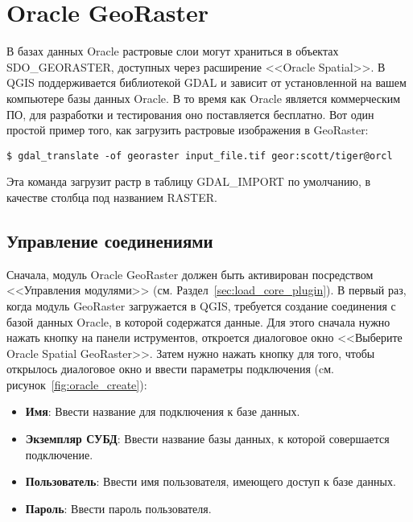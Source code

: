 
\section{Oracle GeoRaster}


В базах данных Oracle растровые слои могут храниться в объектах
SDO\_GEORASTER, доступных через расширение <<Oracle Spatial>>. В QGIS
 поддерживается
библиотекой GDAL и зависит от установленной на вашем компьютере базы
данных Oracle. В то время как Oracle является коммерческим ПО, для
разработки и тестирования оно поставляется бесплатно. Вот один простой
пример того, как загрузить растровые изображения в GeoRaster:

\begin{verbatim}
$ gdal_translate -of georaster input_file.tif geor:scott/tiger@orcl
\end{verbatim}

Эта команда загрузит растр в таблицу GDAL\_IMPORT по умолчанию, в
качестве столбца под названием RASTER.

\subsection{Управление соединениями}

Сначала, модуль Oracle GeoRaster должен быть активирован посредством
<<Управления модулями>> (см. Раздел~\ref{sec:load_core_plugin}). В
первый раз, когда модуль GeoRaster загружается в QGIS, требуется
создание соединения с базой данных Oracle, в которой содержатся данные.
Для этого сначала нужно нажать кнопку
 на панели
иструментов, откроется диалоговое окно <<Выберите Oracle Spatial GeoRaster>>.
Затем нужно нажать кнопку  для того, чтобы открылось
диалоговое окно и ввести параметры подключения (cм. рисунок~\ref{fig:oracle_create}):

\begin{itemize}[label=--]
\item \textbf{Имя}: Ввести название для подключения к базе данных.
\item \textbf{Экземпляр СУБД}: Ввести название базы данных, к которой
совершается подключение.
\item \textbf{Пользователь}: Ввести имя пользователя, имеющего доступ
к базе данных.
\item \textbf{Пароль}: Ввести пароль пользователя.
\end{itemize}

